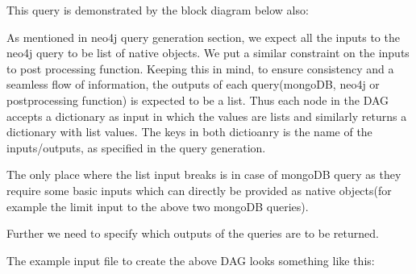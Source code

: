 \documentclass[letterpaper,10pt,english]{sphinxmanual}
\begin{document}
This query is demonstrated by the block diagram below also:

\noindent{}

As mentioned in neo4j query generation section, we expect all the inputs to the neo4j query to be  list of native objects. We put a similar constraint on the inputs to post processing function. Keeping this in mind, to ensure consistency and a seamless flow of information, the outputs of each query(mongoDB, neo4j or postprocessing function) is expected to be a list. Thus each node in the DAG accepts a dictionary as input in which the values are lists and similarly returns a dictionary with list values. The keys in both dictioanry is the name of the inputs/outputs, as specified in the query generation.

The only place where the list input breaks is in case of mongoDB query as they require some basic inputs which can directly be provided as native objects(for example the limit input to the above two mongoDB queries).

Further we need to specify which outputs of the queries are to be returned.

The example input file to create the above DAG looks something like this:

\begin{sphinxVerbatim}[commandchars=\\\{\}]
 
 
 
 
 
\end{sphinxVerbatim}
\end{document}
